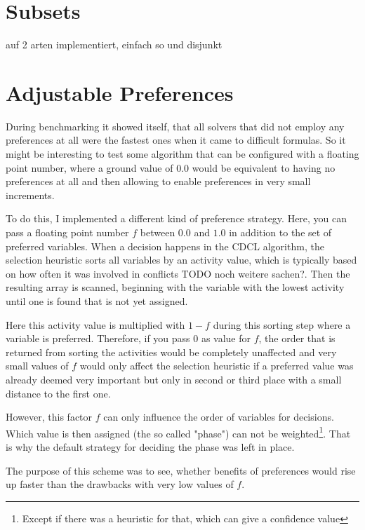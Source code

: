 \section{Subsets}


auf 2 arten implementiert, einfach so und disjunkt


\section{Adjustable Preferences}
During benchmarking it showed itself, that all solvers that did not employ any preferences at all were the fastest ones when it came to difficult formulas. So it might be interesting to test some algorithm that can be configured with a floating point number, where a ground value of $0.0$ would be equivalent to having no preferences at all and then allowing to enable preferences in very small increments.

To do this, I implemented a different kind of preference strategy. Here, you can pass a floating point number $f$ between $0.0$ and $1.0$ in addition to the set of preferred variables. When a decision happens in the CDCL algorithm, the selection heuristic sorts all variables by an activity value, which is typically based on how often it was involved in conflicts TODO noch weitere sachen?. Then the resulting array is scanned, beginning with the variable with the lowest activity until one is found that is not yet assigned. 

Here this activity value is multiplied with $1-f$ during this sorting step where a variable is preferred. Therefore, if you pass $0$ as value for $f$, the order that is returned from sorting the activities would be completely unaffected and very small values of $f$ would only affect the selection heuristic if a preferred value was already deemed very important but only in second or third place with a small distance to the first one. 

However, this factor $f$ can only influence the order of variables for decisions. Which value is then assigned (the so called "phase") can not be weighted\footnote{Except if there was a heuristic for that, which can give a confidence value}. That is why the default strategy for deciding the phase was left in place. 

The purpose of this scheme was to see, whether benefits of preferences would rise up faster than the drawbacks with very low values of $f$.

